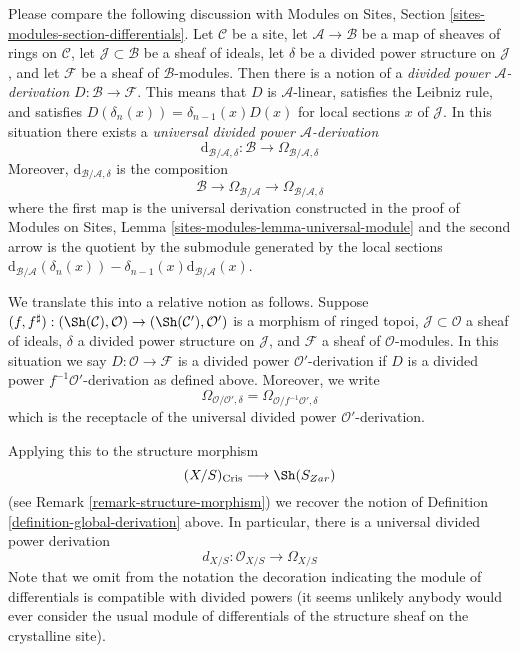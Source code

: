 \medskip\noindent
Please compare the following discussion with
Modules on Sites, Section \ref{sites-modules-section-differentials}. Let
$\mathcal{C}$ be a site, let $\mathcal{A} \to \mathcal{B}$ be a
map of sheaves of rings on $\mathcal{C}$, let $\mathcal{J} \subset \mathcal{B}$
be a sheaf of ideals, let $\delta$ be a divided power structure on
$\mathcal{J}$, and let $\mathcal{F}$ be a sheaf of $\mathcal{B}$-modules.
Then there is a notion of a {\it divided power $\mathcal{A}$-derivation}
$D : \mathcal{B} \to \mathcal{F}$. This means that $D$ is $\mathcal{A}$-linear,
satisfies the Leibniz rule, and satisfies
$D(\delta_n(x)) = \delta_{n - 1}(x)D(x)$ for local sections $x$ of
$\mathcal{J}$. In this situation there exists a
{\it universal divided power $\mathcal{A}$-derivation}
$$
\text{d}_{\mathcal{B}/\mathcal{A}, \delta} :
\mathcal{B}
\longrightarrow
\Omega_{\mathcal{B}/\mathcal{A}, \delta}
$$
Moreover, $\text{d}_{\mathcal{B}/\mathcal{A}, \delta}$ is the composition
$$
\mathcal{B}
\longrightarrow
\Omega_{\mathcal{B}/\mathcal{A}}
\longrightarrow
\Omega_{\mathcal{B}/\mathcal{A}, \delta}
$$
where the first map is the universal derivation constructed in the proof
of Modules on Sites, Lemma \ref{sites-modules-lemma-universal-module}
and the second arrow is the quotient by the submodule generated by
the local sections
$\text{d}_{\mathcal{B}/\mathcal{A}}(\delta_n(x)) -
\delta_{n - 1}(x)\text{d}_{\mathcal{B}/\mathcal{A}}(x)$.

\medskip\noindent
We translate this into a relative notion as follows. Suppose
$(f, f^\sharp) : (\Sh(\mathcal{C}), \mathcal{O}) \to
(\Sh(\mathcal{C}'), \mathcal{O}')$ is a morphism of ringed topoi,
$\mathcal{J} \subset \mathcal{O}$ a sheaf of ideals, $\delta$ a
divided power structure on $\mathcal{J}$, and $\mathcal{F}$ a sheaf
of $\mathcal{O}$-modules. In this situation we say
$D : \mathcal{O} \to \mathcal{F}$ is a divided power $\mathcal{O}'$-derivation
if $D$ is a divided power $f^{-1}\mathcal{O}'$-derivation as defined above.
Moreover, we write
$$
\Omega_{\mathcal{O}/\mathcal{O}', \delta} =
\Omega_{\mathcal{O}/f^{-1}\mathcal{O}', \delta}
$$
which is the receptacle of the universal divided power
$\mathcal{O}'$-derivation.

\medskip\noindent
Applying this to the structure morphism
$$
(X/S)_{\text{Cris}} \longrightarrow \Sh(S_{Zar})
$$
(see Remark \ref{remark-structure-morphism}) we recover the notion of
Definition \ref{definition-global-derivation} above.
In particular, there is a universal divided power derivation
$$
d_{X/S} : \mathcal{O}_{X/S} \to \Omega_{X/S}
$$
Note that we omit from the notation the decoration indicating the
module of differentials is compatible with divided powers (it seems
unlikely anybody would ever consider the usual module of differentials
of the structure sheaf on the crystalline site).

